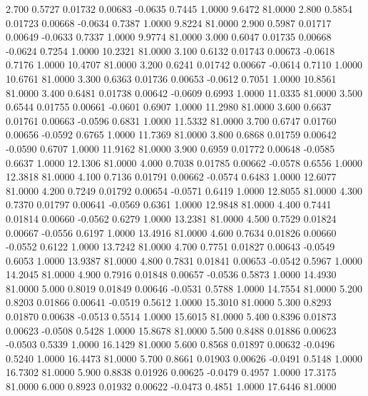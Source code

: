    2.700   0.5727   0.01732   0.00683  -0.0635   0.7445   1.0000   9.6472  81.0000
   2.800   0.5854   0.01723   0.00668  -0.0634   0.7387   1.0000   9.8224  81.0000
   2.900   0.5987   0.01717   0.00649  -0.0633   0.7337   1.0000   9.9774  81.0000
   3.000   0.6047   0.01735   0.00668  -0.0624   0.7254   1.0000  10.2321  81.0000
   3.100   0.6132   0.01743   0.00673  -0.0618   0.7176   1.0000  10.4707  81.0000
   3.200   0.6241   0.01742   0.00667  -0.0614   0.7110   1.0000  10.6761  81.0000
   3.300   0.6363   0.01736   0.00653  -0.0612   0.7051   1.0000  10.8561  81.0000
   3.400   0.6481   0.01738   0.00642  -0.0609   0.6993   1.0000  11.0335  81.0000
   3.500   0.6544   0.01755   0.00661  -0.0601   0.6907   1.0000  11.2980  81.0000
   3.600   0.6637   0.01761   0.00663  -0.0596   0.6831   1.0000  11.5332  81.0000
   3.700   0.6747   0.01760   0.00656  -0.0592   0.6765   1.0000  11.7369  81.0000
   3.800   0.6868   0.01759   0.00642  -0.0590   0.6707   1.0000  11.9162  81.0000
   3.900   0.6959   0.01772   0.00648  -0.0585   0.6637   1.0000  12.1306  81.0000
   4.000   0.7038   0.01785   0.00662  -0.0578   0.6556   1.0000  12.3818  81.0000
   4.100   0.7136   0.01791   0.00662  -0.0574   0.6483   1.0000  12.6077  81.0000
   4.200   0.7249   0.01792   0.00654  -0.0571   0.6419   1.0000  12.8055  81.0000
   4.300   0.7370   0.01797   0.00641  -0.0569   0.6361   1.0000  12.9848  81.0000
   4.400   0.7441   0.01814   0.00660  -0.0562   0.6279   1.0000  13.2381  81.0000
   4.500   0.7529   0.01824   0.00667  -0.0556   0.6197   1.0000  13.4916  81.0000
   4.600   0.7634   0.01826   0.00660  -0.0552   0.6122   1.0000  13.7242  81.0000
   4.700   0.7751   0.01827   0.00643  -0.0549   0.6053   1.0000  13.9387  81.0000
   4.800   0.7831   0.01841   0.00653  -0.0542   0.5967   1.0000  14.2045  81.0000
   4.900   0.7916   0.01848   0.00657  -0.0536   0.5873   1.0000  14.4930  81.0000
   5.000   0.8019   0.01849   0.00646  -0.0531   0.5788   1.0000  14.7554  81.0000
   5.200   0.8203   0.01866   0.00641  -0.0519   0.5612   1.0000  15.3010  81.0000
   5.300   0.8293   0.01870   0.00638  -0.0513   0.5514   1.0000  15.6015  81.0000
   5.400   0.8396   0.01873   0.00623  -0.0508   0.5428   1.0000  15.8678  81.0000
   5.500   0.8488   0.01886   0.00623  -0.0503   0.5339   1.0000  16.1429  81.0000
   5.600   0.8568   0.01897   0.00632  -0.0496   0.5240   1.0000  16.4473  81.0000
   5.700   0.8661   0.01903   0.00626  -0.0491   0.5148   1.0000  16.7302  81.0000
   5.900   0.8838   0.01926   0.00625  -0.0479   0.4957   1.0000  17.3175  81.0000
   6.000   0.8923   0.01932   0.00622  -0.0473   0.4851   1.0000  17.6446  81.0000
